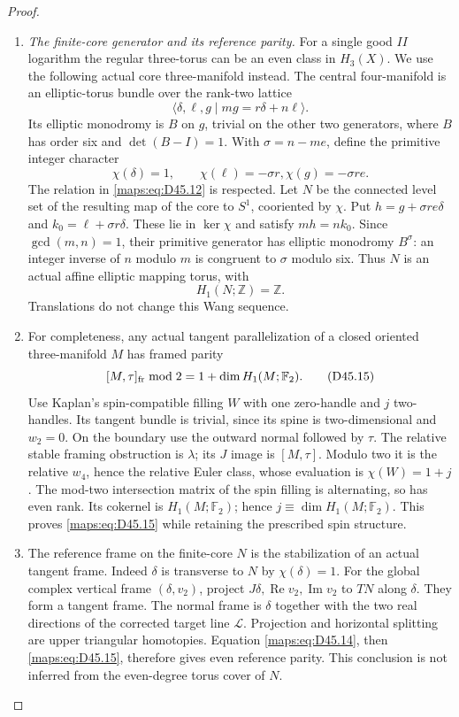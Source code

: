 \begin{proof}
\begin{enumerate}[label=\arabic*.,leftmargin=*]
\item \emph{The finite-core generator and its reference parity.}
For a single good $II$ logarithm the regular three-torus
can be an even class in $H_3(X)$. We use the following
actual core three-manifold instead. The central four-manifold
is an elliptic-torus bundle over the rank-two lattice
\[
 \langle\delta,\ell,g\mid mg=r\delta+n\ell\rangle.
                                                               \tag{D45.12}\label{maps:eq:D45.12}
\]
Its elliptic monodromy is $B$ on $g$, trivial on the other
two generators, where $B$ has order six and
$\det(B-I)=1$. With $\sigma=n-me$, define the primitive
integer character
\[
 \chi(\delta)=1,\qquad \chi(\ell)=-\sigma r,
                       \chi(g)=-\sigma re.                 \tag{D45.13}\label{maps:eq:D45.13}
\]
The relation in \eqref{maps:eq:D45.12} is respected. Let $N$ be the
connected level set of the resulting map of the core to
$S^1$, cooriented by $\chi$. Put
$h=g+\sigma re\delta$ and $k_0=\ell+\sigma r\delta$.
These lie in $\ker\chi$ and satisfy $mh=nk_0$.
Since $\gcd(m,n)=1$, their primitive generator has elliptic
monodromy $B^\sigma$: an integer inverse of $n$ modulo
$m$ is congruent to $\sigma$ modulo six. Thus $N$ is an
actual affine elliptic mapping torus, with
\[
                        H_1(N;\mathbb Z)=\mathbb Z.        \tag{D45.14}\label{maps:eq:D45.14}
\]
Translations do not change this Wang sequence.

\item For completeness, any actual tangent parallelization of
a closed oriented three-manifold $M$ has framed parity
\[
        [M,\tau]_{\rm fr}\bmod2
                    =1+\dim H_1(M;\mathbb F_2).             \tag{D45.15}\label{maps:eq:D45.15}
\]
Use Kaplan's spin-compatible filling $W$ with one zero-handle
and $j$ two-handles. Its tangent bundle is trivial, since
its spine is two-dimensional and $w_2=0$. On the boundary
use the outward normal followed by $\tau$.
The relative stable framing obstruction is $\lambda$;
its $J$ image is $[M,\tau]$. Modulo two it is the relative
$w_4$, hence the relative Euler class, whose evaluation is
$\chi(W)=1+j$. The mod-two intersection matrix of the
spin filling is alternating, so has even rank. Its
cokernel is $H_1(M;\mathbb F_2)$; hence
$j\equiv\dim H_1(M;\mathbb F_2)$. This proves \eqref{maps:eq:D45.15}
while retaining the prescribed spin structure.

\item The reference frame on the finite-core $N$ is the
stabilization of an actual tangent frame. Indeed $\delta$
is transverse to $N$ by $\chi(\delta)=1$. For the global
complex vertical frame $(\delta,v_2)$, project
$J\delta,\operatorname{Re}v_2,\operatorname{Im}v_2$ to $TN$
along $\delta$. They form a tangent frame. The normal
frame is $\delta$ together with the two real directions
of the corrected target line $\mathcal L$. Projection
and horizontal splitting are upper triangular homotopies.
Equation \eqref{maps:eq:D45.14}, then \eqref{maps:eq:D45.15}, therefore gives even
reference parity. This conclusion is not inferred from
the even-degree torus cover of $N$.


\end{enumerate}
\end{proof}
